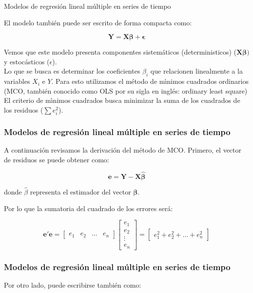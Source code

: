 \documentclass[xcolor=(list of options)]{beamer}
\begin{document}
\begin{section}{Modelos de regresi\'on lineal m\'ultiple en series de tiempo}
\begin{frame}
El modelo tambi\'en puede ser escrito de forma compacta como:

\[
\mathbf{Y}=\mathbf{X}\mathbf{\beta}+\mathbf{\epsilon}
\]

Vemos que este modelo presenta componentes sistem\'aticos (deterministicos) ($\mathbf{X\beta})$ 
y estoc\'asticos ($\epsilon$).\\
Lo que se busca es determinar los coeficientes $\beta_{i}$ que relacionen linealmente a la variables $X_{i}$ e $Y$. 
Para esto utilizamos el m\'etodo de m\'\i{}nimos cuadrados ordinarios (MCO, tambi\'en conocido como OLS por su sigla en ingl\'es: ordinary least square)
El criterio de m\'\i{}nimos cuadrados busca minimizar la suma de los cuadrados
de los residuos ($\sum e_{i}^{2}$).

\end{frame}

\begin{frame}
\frametitle{Modelos de regresi\'on lineal m\'ultiple en series de tiempo}

A continuaci\'on revisamos la derivaci\'on del m\'etodo de MCO. Primero, el vector de residuos se puede obtener como:

\[
\mathbf{e}=\mathbf{Y}-\mathbf{X\hat{\beta}}
\]

donde \textbf{$\hat{\beta}$} representa el estimador del vector $\mathbf{\beta}$.

Por lo que la sumatoria del cuadrado de los errores ser\'a:

\[
\mathbf{e'e}=\begin{bmatrix}e_{1} & e_{2} & \ldots & e_{n}\end{bmatrix}\begin{bmatrix}e_{1}\\
e_{2}\\
\vdots\\
e_{n}
\end{bmatrix}=\begin{bmatrix}e_{1}^{2}+e_{2}^{2}+\ldots+e_{n}^{2}\end{bmatrix}
\]

\end{frame}
\begin{frame}
\frametitle{Modelos de regresi\'on lineal m\'ultiple en series de tiempo}

Por otro lado, puede escribirse tambi\'en como:


\end{frame}
\end{section}
\end{document}
